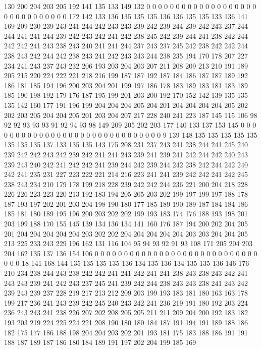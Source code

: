 130 200 204 203 205 192 141 135 133 149 132 0 0 0 0 0 0 0 0 0
0 0 0 0 0 0 0 0 0 0 0 0 0 0 0 0 0 0 0 0
0 172 142 133 136 135 135 135 136 136 135 135 133 136 141 169 209 230 239 243
241 244 242 243 243 239 242 239 244 239 242 243 237 244 244 241 241 244 239 242
243 242 241 242 238 245 242 239 244 241 238 242 244 242 242 241 243 238 243 240
241 241 244 237 243 237 245 242 238 242 242 244 238 243 242 244 242 238 243 241
242 243 243 244 238 235 194 170 178 207 227 234 241 243 237 243 232 206 193 203
204 203 207 211 208 209 213 210 191 189 205 215 220 224 222 221 218 216 199 187
187 192 187 184 186 187 187 189 192 186 181 185 194 196 200 203 204 201 199 197
186 178 183 189 183 181 183 189 185 190 198 192 179 176 187 195 199 201 203 200
192 170 152 142 139 135 135 135 142 160 177 191 196 199 204 204 204 205 204 201
204 204 204 204 205 202 202 203 205 204 204 205 201 203 204 207 217 228 240 241
223 187 145 115 106 98 92 92 93 93 93 91 92 94 93 98 149 209 205 202
203 177 140 133 137 153 145 0 0 0 0 0 0 0 0 0 0 0 0 0
0 0 0 0 0 0 0 0 0 0 0 0 0 0 0 0 0 9 139 148
135 135 135 135 135 135 135 135 137 133 135 135 143 175 208 231 237 243 241 238
244 241 245 240 239 242 242 243 242 239 242 241 241 243 239 241 239 241 242 244
242 240 243 239 243 240 242 241 242 242 241 239 244 242 239 244 242 238 242 244
242 240 242 241 235 231 227 223 222 221 214 216 223 241 241 239 242 242 241 242
245 238 243 234 210 179 178 199 218 228 239 242 242 244 236 221 200 204 218 228
226 226 223 223 220 213 192 183 194 205 205 203 202 199 197 199 197 188 178 187
193 197 202 201 203 204 198 190 180 177 185 189 190 189 187 184 184 186 185 181
180 189 195 196 200 203 202 202 199 193 183 174 176 188 193 198 201 203 199 188
170 155 145 139 134 136 134 141 160 176 187 194 200 202 204 205 201 204 204 204
204 204 203 202 202 204 204 204 204 204 203 203 204 204 205 213 225 233 243 229
196 162 131 116 104 95 94 93 92 91 93 108 171 205 204 203 204 162 135 137
136 154 106 0 0 0 0 0 0 0 0 0 0 0 0 0 0 0 0 0
0 0 0 0 0 0 0 0 0 0 0 0 0 0 18 141 168 144 135 135
135 135 136 134 135 136 134 135 135 136 146 176 210 234 238 244 243 238 242 242
241 241 242 241 241 238 243 238 243 242 241 243 243 239 241 242 243 237 245 241
239 242 244 238 243 243 238 241 243 242 239 243 239 237 228 219 217 213 212 209
203 199 193 183 181 180 163 163 178 199 217 236 241 243 239 242 245 240 243 242
241 236 219 191 180 192 203 224 236 243 243 241 238 226 207 202 208 205 205 211
211 209 204 200 192 183 182 193 203 219 224 225 224 221 208 190 180 180 184 187
191 194 191 189 188 186 182 175 177 186 188 198 204 204 203 202 201 193 181 175
183 188 186 191 191 188 187 189 187 186 180 184 189 191 197 202 204 199 185 169
